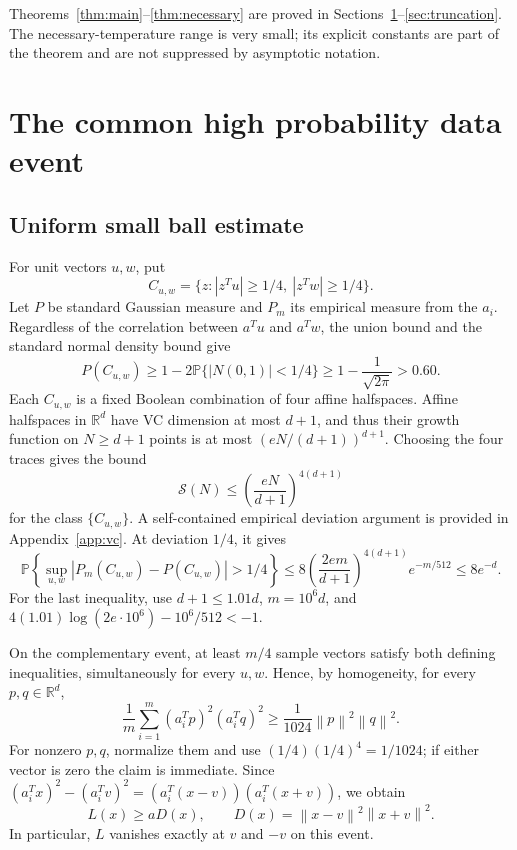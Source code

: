 \documentclass[11pt,letterpaper]{article}
\numberwithin{equation}{section}
\theoremstyle{remark}
\newcommand{\R}{\mathbb R}
\newcommand{\Prb}{\mathbb P}
\newcommand{\1}{\mathbf 1}
\newcommand{\norm}[1]{\left\lVert#1\right\rVert}
\newcommand{\abs}[1]{\left\lvert#1\right\rvert}
\begin{document}
Theorems~\ref{thm:main}--\ref{thm:necessary} are proved in Sections~\ref{sec:event}--\ref{sec:truncation}. The necessary-temperature range is very small; its explicit constants are part of the theorem and are not suppressed by asymptotic notation.

\section{The common high probability data event}\label{sec:event}

\subsection{Uniform small ball estimate}

For unit vectors $u,w$, put
\[
 C_{u,w}=\{z:\abs{z^Tu}\ge1/4,\ \abs{z^Tw}\ge1/4\}.
\]
Let $P$ be standard Gaussian measure and $P_m$ its empirical measure from the $a_i$. Regardless of the correlation between $a^Tu$ and $a^Tw$, the union bound and the standard normal density bound give
\begin{equation}\label{eq:population-sb}
 P(C_{u,w})\ge1-2\Prb\{\abs{N(0,1)}<1/4\}
 \ge1-\frac1{\sqrt{2\pi}}>0.60.
\end{equation}
Each $C_{u,w}$ is a fixed Boolean combination of four affine halfspaces. Affine halfspaces in $\R^d$ have VC dimension at most $d+1$, and thus their growth function on $N\ge d+1$ points is at most $(eN/(d+1))^{d+1}$. Choosing the four traces gives the bound
\begin{equation}\label{eq:growth}
 \mathcal S(N)\le\left(\frac{eN}{d+1}\right)^{4(d+1)}
\end{equation}
for the class $\{C_{u,w}\}$. A self-contained empirical deviation argument is provided in Appendix~\ref{app:vc}. At deviation $1/4$, it gives
\begin{equation}\label{eq:vc}
 \Prb\left\{\sup_{u,w}\abs{P_m(C_{u,w})-P(C_{u,w})}>1/4\right\}
 \le8\left(\frac{2em}{d+1}\right)^{4(d+1)}e^{-m/512}
 \le8e^{-d}.
\end{equation}
For the last inequality, use $d+1\le1.01d$, $m=10^6d$, and
$4(1.01)\log(2e\cdot10^6)-10^6/512<-1$.

On the complementary event, at least $m/4$ sample vectors satisfy both defining inequalities, simultaneously for every $u,w$. Hence, by homogeneity, for every $p,q\in\R^d$,
\begin{equation}\label{eq:SB}
 \frac1m\sum_{i=1}^m(a_i^Tp)^2(a_i^Tq)^2
 \ge\frac1{1024}\norm p^2\norm q^2.
\end{equation}
For nonzero $p,q$, normalize them and use $(1/4)(1/4)^4=1/1024$; if either vector is zero the claim is immediate. Since
$ (a_i^Tx)^2-(a_i^Tv)^2=(a_i^T(x-v))(a_i^T(x+v))$,
we obtain
\begin{equation}\label{eq:LD}
 L(x)\ge aD(x),\qquad D(x)=\norm{x-v}^2\norm{x+v}^2.
\end{equation}
In particular, $L$ vanishes exactly at $v$ and $-v$ on this event.
\end{document}
